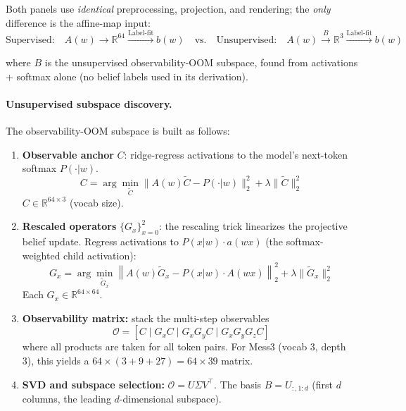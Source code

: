 \documentclass[11pt]{article}
\begin{document}
Both panels use \textit{identical} preprocessing, projection, and rendering; the \textit{only} difference is the affine-map input:
\begin{equation}
\text{Supervised:} \quad A(w) \to \mathbb{R}^{64} \xrightarrow{\text{Label-fit}} b(w)
\quad \text{vs.} \quad
\text{Unsupervised:} \quad A(w) \xrightarrow{B} \mathbb{R}^{3} \xrightarrow{\text{Label-fit}} b(w)
\end{equation}

where $B$ is the unsupervised observability-OOM subspace, found from activations + softmax alone (no belief labels used in its derivation).

\paragraph{Unsupervised subspace discovery.}

The observability-OOM subspace is built as follows:

\begin{enumerate}
\item \textbf{Observable anchor } $C$: ridge-regress activations to the model's next-token softmax $P(\cdot | w)$.
\begin{equation}
C = \arg\min_{\tilde{C}} \| A(w) \tilde{C} - P(\cdot | w) \|^2_2 + \lambda \| \tilde{C} \|_2^2
\end{equation}
$C \in \mathbb{R}^{64 \times 3}$ (vocab size).

\item \textbf{Rescaled operators } $\{G_x\}_{x=0}^{2}$: the rescaling trick linearizes the projective belief update. Regress activations to $P(x | w) \cdot a(wx)$ (the softmax-weighted child activation):
\begin{equation}
G_x = \arg\min_{\tilde{G}_x} \left\| A(w) \tilde{G}_x - P(x | w) \cdot A(wx) \right\|^2_2 + \lambda \| \tilde{G}_x \|_2^2
\end{equation}
Each $G_x \in \mathbb{R}^{64 \times 64}$.

\item \textbf{Observability matrix:} stack the multi-step observables
\begin{equation}
\mathcal{O} = [C \mid G_x C \mid G_x G_y C \mid G_x G_y G_z C]
\end{equation}
where all products are taken for all token pairs. For Mess3 (vocab 3, depth 3), this yields a $64 \times (3 + 9 + 27) = 64 \times 39$ matrix.

\item \textbf{SVD and subspace selection:} $\mathcal{O} = U \Sigma V^{\top}$. The basis $B = U_{:, 1:d}$ (first $d$ columns, the leading $d$-dimensional subspace).
\end{enumerate}
\end{document}
